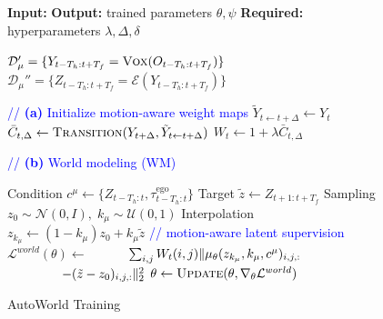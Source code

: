 \documentclass[runningheads]{llncs}
\begin{document}
\begin{figure}[!t]
\centering
\begin{minipage}[t]{0.51\textwidth}
\begin{algorithm}[H]
\scriptsize
\caption{\small AutoWorld Training}
\label{alg:train}
\begin{algorithmic}[1]

 \State \textbf{Input:}
\State \textbf{Output:} trained parameters $\theta,\psi$
\State \textbf{Required:} hyperparameters $\lambda,\Delta,\delta$

\Statex
\State $\mathcal{D}_\mu'=\{Y_{t-T_h:t+T_f}=\textsc{Vox}(O_{t-T_h:t+T_f})\}$ \label{algline:train_voxelization_start}
\State $\mathcal{D}_\mu''=\{Z_{t-T_h:t+T_f}=\mathcal{E}(Y_{t-T_h:t+T_f})\}$ \label{algline:train_voxelization_end}

\Statex
\Statex \textcolor{blue}{// \textbf{(a)} Initialize motion-aware weight maps} 
 \label{algline:motion_aware_weight_maps_start}
    \State $\tilde{Y}_{t \leftarrow t+\Delta}\gets Y_t$
    \State $\bar C_{t,\Delta}\gets\textsc{Transition}(Y_{t+\Delta},\tilde{Y}_{t \leftarrow t+\Delta})$
    \State $W_t\gets1+\lambda \bar C_{t,\Delta}$  \label{algline:motion_aware_weight_maps_end}
    \EndFor
\EndFor

\Statex
\Statex \textcolor{blue}{// \textbf{(b)} World modeling (WM)}

 \label{algline:wm_start}
    \State Condition $c^\mu\gets\{Z_{t-T_h:t},\tau^{\text{ego}}_{t-T_h:t}\}$
    \State Target $\tilde z\gets Z_{t+1:t+T_f}$
    \State Sampling $z_0\sim\mathcal N(0,I),\;k_\mu\sim\mathcal U(0,1)$
    \State Interpolation $z_{k_\mu}\gets(1-k_\mu)z_0+k_\mu\tilde z$
    \Statex \hspace{4mm} \textcolor{blue}{// motion-aware latent supervision}
    \State $\mathcal L^{world}(\theta)\gets$
    \Statex $\hspace{10mm}\sum_{i,j}W_t(i,j)\|\mu_\theta(z_{k_\mu},k_\mu,c^\mu)_{i,j,:}$
    \Statex $\hspace{15mm} -(\tilde z-z_0)_{i,j,:}\|_2^2$
    \State $\theta\gets\textsc{Update}(\theta,\nabla_\theta\mathcal L^{world})$ \label{algline:wm_end}
\EndFor


\end{algorithmic}
\end{algorithm}
\end{minipage}
\end{figure}
\end{document}
